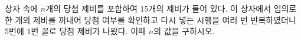 상자 속에 $n$개의 당첨 제비를 포함하여 $15$개의 제비가 들어 있다. 이 상자에서 임의로 한 개의 제비를 꺼내어 당첨 여부를 확인하고 다시 넣는 시행을 여러 번 반복하였더니 $5$번에 $1$번 꼴로 당첨 제비가 나왔다. 이때 $n$의 값을 구하시오.
